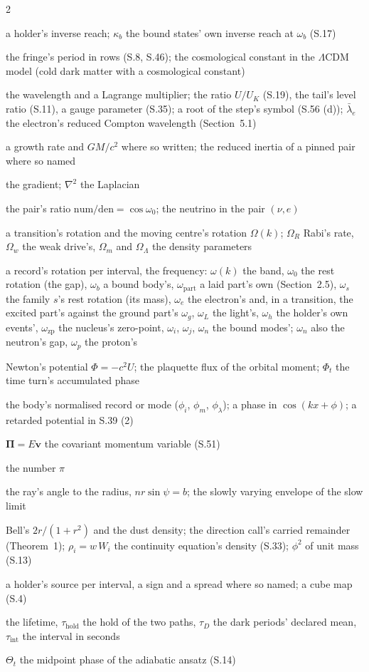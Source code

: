 \documentclass[pdflatex,sn-mathphys-num]{sn-jnl}
\newcommand{\num}{\mathrm{num}}
\newcommand{\den}{\mathrm{den}}
\newcommand{\nom}[2]{\item[{#1}] #2}
\theoremstyle{thmstyleone}
\begin{document}
\begin{multicols}{2}
\begin{description}[style=unboxed,leftmargin=0pt,itemsep=0pt,parsep=0pt,font=\normalfont]
\nom{$\kappa$}{a holder's inverse reach; $\kappa_b$ the bound states' own inverse reach at $\omega_b$ (S.17)}
\nom{$\Lambda$}{the fringe's period in rows (S.8, S.46); the cosmological constant in the $\Lambda$CDM model (cold dark matter with a cosmological constant)}
\nom{$\lambda$}{the wavelength and a Lagrange multiplier; the ratio $U / U_K$ (S.19), the tail's level ratio (S.11), a gauge parameter (S.35); a root of the step's symbol (S.56 (d)); $\bar\lambda_e$ the electron's reduced Compton wavelength (Section~5.1)}
\nom{$\mu$}{a growth rate and $GM / c^2$ where so written; the reduced inertia of a pinned pair where so named}
\nom{$\nabla$}{the gradient; $\nabla^2$ the Laplacian}
\nom{$\nu$}{the pair's ratio $\num / \den = \cos\omega_0$; the neutrino in the pair $(\nu, e)$}
\nom{$\Omega$}{a transition's rotation and the moving centre's rotation $\Omega(k)$; $\Omega_R$ Rabi's rate, $\Omega_w$ the weak drive's, $\Omega_m$ and $\Omega_\Lambda$ the density parameters}
\nom{$\omega$}{a record's rotation per interval, the frequency: $\omega(k)$ the band, $\omega_0$ the rest rotation (the gap), $\omega_b$ a bound body's, $\omega_{\mathrm{part}}$ a laid part's own (Section~2.5), $\omega_s$ the family $s$'s rest rotation (its mass), $\omega_e$ the electron's and, in a transition, the excited part's against the ground part's $\omega_g$, $\omega_L$ the light's, $\omega_h$ the holder's own events', $\omega_{\mathrm{zp}}$ the nucleus's zero-point, $\omega_i$, $\omega_j$, $\omega_n$ the bound modes'; $\omega_n$ also the neutron's gap, $\omega_p$ the proton's}
\nom{$\Phi$}{Newton's potential $\Phi = -c^2 U$; the plaquette flux of the orbital moment; $\Phi_t$ the time turn's accumulated phase}
\nom{$\phi$}{the body's normalised record or mode ($\phi_i$, $\phi_m$, $\phi_\lambda$); a phase in $\cos(kx + \phi)$; a retarded potential in S.39 (2)}
\nom{$\Pi$}{$\boldsymbol\Pi = E\mathbf v$ the covariant momentum variable (S.51)}
\nom{$\pi$}{the number $\pi$}
\nom{$\psi$}{the ray's angle to the radius, $nr\sin\psi = b$; the slowly varying envelope of the slow limit}
\nom{$\rho$}{Bell's $2r / (1 + r^2)$ and the dust density; the direction call's carried remainder (Theorem~1); $\rho_i = w\,W_i$ the continuity equation's density (S.33); $\phi^2$ of unit mass (S.13)}
\nom{$\sigma$}{a holder's source per interval, a sign and a spread where so named; a cube map (S.4)}
\nom{$\tau$}{the lifetime, $\tau_{\mathrm{hold}}$ the hold of the two paths, $\tau_D$ the dark periods' declared mean, $\tau_{\mathrm{int}}$ the interval in seconds}
\nom{$\Theta$}{$\Theta_t$ the midpoint phase of the adiabatic ansatz (S.14)}

\end{description}
\end{multicols}
\end{document}
